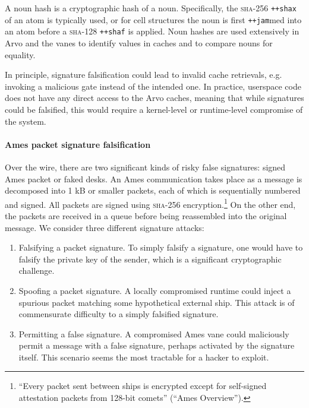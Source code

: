 \documentclass[twoside]{article}
\begin{document}
A noun hash is a cryptographic hash of a noun.  Specifically, the \textsc{sha}-256 \lstinline[style=inlinecode]{++shax} of an atom is typically used, or for cell structures the noun is first \lstinline[style=inlinecode]{++jam}med into an atom before a \textsc{sha}-128 \lstinline[style=inlinecode]{++shaf} is applied.  Noun hashes are used extensively in Arvo and the vanes to identify values in caches and to compare nouns for equality.

\sloppy
In principle, signature falsification could lead to invalid cache retrievals, e.g. invoking a malicious gate instead of the intended one.  In practice, userspace code does not have any direct access to the Arvo caches, meaning that while signatures could be falsified, this would require a kernel-level or runtime-level compromise of the system.

\paragraph{Ames packet signature falsification}
Over the wire, there are two significant kinds of risky false signatures:  signed Ames packet or faked desks.  An Ames communication takes place as a message is decomposed into 1 kB or smaller packets, each of which is sequentially numbered and signed.  All packets are signed using \textsc{sha}-256 encryption.\footnote{“Every packet sent between ships is encrypted except for self-signed attestation packets from 128-bit comets” (“Ames  Overview”).}  On the other end, the packets are received in a queue before being reassembled into the original message.  We consider three different signature attacks:

\begin{enumerate}
  \item  Falsifying a packet signature.  To simply falsify a signature, one would have to falsify the private key of the sender, which is a significant cryptographic challenge.
  \item  Spoofing a packet signature.  A locally compromised runtime could inject a spurious packet matching some hypothetical external ship.  This attack is of commensurate difficulty to a simply falsified signature.
  \item  Permitting a false signature.  A compromised Ames vane could maliciously permit a message with a false signature, perhaps activated by the signature itself.  This scenario seems the most tractable for a hacker to exploit.
\end{enumerate}
\end{document}
